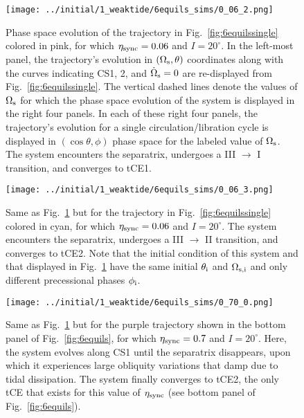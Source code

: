 \documentclass[
        fleqn,
        usenatbib,
    ]{mnras}
\newcommand*{\p}[1]{\left(#1\right)}
\begin{document}
\begin{figure}
    \centering
    \texttt{[image: ../initial/1\_weaktide/6equils\_sims/0\_06\_2.png]}
    \caption{Phase space evolution of the trajectory in
    Fig.~\ref{fig:6equilssingle} colored in pink, for which $\eta_{\rm sync} =
    0.06$ and $I = 20^\circ$. In the
    left-most panel, the trajectory's evolution in $\p{\Omega_{\rm s}, \theta}$
    coordinates along with the curves indicating CS1, 2, and $\dot{\Omega}_{\rm
    s} = 0$ are re-displayed from Fig.~\ref{fig:6equilssingle}. The vertical
    dashed lines denote the values of $\Omega_{\rm s}$ for which the phase space
    evolution of the system is displayed in the right four panels. In each of
    these right four panels, the trajectory's evolution for a single
    circulation/libration cycle is displayed in $\p{\cos \theta, \phi}$ phase
    space for the labeled value of $\Omega_{\rm s}$. The system encounters the
    separatrix, undergoes a III $\to$ I transition, and converges to tCE1.
    }\label{fig:trajs1}
\end{figure}
\begin{figure}
    \texttt{[image: ../initial/1\_weaktide/6equils\_sims/0\_06\_3.png]}
    \caption{Same as Fig.~\ref{fig:trajs1} but for the trajectory in
    Fig.~\ref{fig:6equilssingle} colored in cyan, for which $\eta_{\rm sync} =
    0.06$ and $I = 20^\circ$. The system encounters the
    separatrix, undergoes a III $\to$ II transition, and converges to tCE2. Note
    that the initial condition of this system and that displayed in
    Fig.~\ref{fig:trajs1} have the same initial $\theta_{\rm i}$ and
    $\Omega_{\rm s, i}$ and only different precessional phases $\phi_{\rm i}$.
    }\label{fig:trajs2}
\end{figure}
\begin{figure}
    \texttt{[image: ../initial/1\_weaktide/6equils\_sims/0\_70\_0.png]}
    \caption{Same as Fig.~\ref{fig:trajs1} but for the purple trajectory
    shown in the bottom panel of Fig.~\ref{fig:6equils}, for which $\eta_{\rm
    sync} = 0.7$ and $I = 20^\circ$. Here, the system
    evolves along CS1 until the separatrix disappears, upon which it experiences
    large obliquity variations that damp due to tidal dissipation. The system
    finally converges to tCE2, the only tCE that exists for this value of
    $\eta_{\rm sync}$ (see bottom panel of Fig.~\ref{fig:6equils}).}\label{fig:trajs3}
\end{figure}
\end{document}

